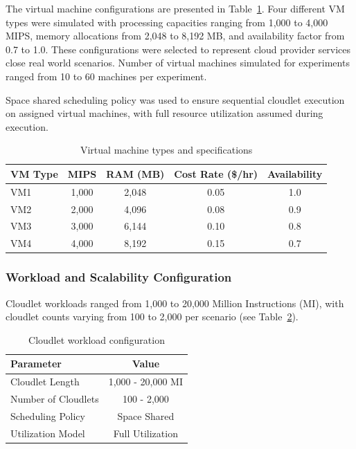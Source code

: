 \documentclass[pdflatex,sn-mathphys-num]{sn-jnl}%
\begin{document}
The virtual machine configurations are presented in Table~\ref{tab_vm}. Four different VM types were simulated with processing capacities ranging from 1,000 to 4,000 MIPS, memory allocations from 2,048 to 8,192 MB, and availability factor from 0.7 to 1.0. These configurations were selected to represent cloud provider services close real world scenarios. Number of virtual machines simulated for experiments ranged from 10 to 60 machines per experiment.

Space shared scheduling policy was used to ensure sequential cloudlet execution on assigned virtual machines, with full resource utilization assumed during execution.
 
\begin{table}[htbp]
\centering
\caption{Virtual machine types and specifications}\label{tab_vm}
\begin{tabular*}{\textwidth}{@{\extracolsep\fill}lcccc}
\toprule
VM Type & MIPS & RAM (MB) & Cost Rate (\$/hr) & Availability \\
\midrule
VM1 & 1,000 & 2,048 & 0.05 & 1.0 \\
VM2 & 2,000 & 4,096 & 0.08 & 0.9 \\
VM3 & 3,000 & 6,144 & 0.10 & 0.8 \\
VM4 & 4,000 & 8,192 & 0.15 & 0.7 \\
\bottomrule
\end{tabular*}
\end{table}
 
\subsubsection{Workload and Scalability Configuration}
 
Cloudlet workloads ranged from 1,000 to 20,000 Million Instructions (MI), with cloudlet counts varying from 100 to 2,000 per scenario (see Table~\ref{tab_cloudlets}).
 
\begin{table}[htbp]
\centering
\caption{Cloudlet workload configuration}\label{tab_cloudlets}
\begin{tabular*}{\textwidth}{@{\extracolsep\fill}lc}
\toprule
Parameter & Value \\
\midrule
Cloudlet Length & 1,000 - 20,000 MI \\
Number of Cloudlets & 100 - 2,000 \\
Scheduling Policy & Space Shared \\
Utilization Model & Full Utilization \\
\bottomrule
\end{tabular*}
\end{table}
 
\end{document}

